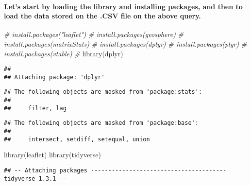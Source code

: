 \documentclass[
]{article}
\newenvironment{Shaded}{\begin{snugshade}}{\end{snugshade}}
\newcommand{\CommentTok}[1]{\textcolor[rgb]{0.56,0.35,0.01}{\textit{#1}}}
\newcommand{\FunctionTok}[1]{\textcolor[rgb]{0.00,0.00,0.00}{#1}}
\newcommand{\NormalTok}[1]{#1}
\begin{document}
\hypertarget{lets-start-by-loading-the-library-and-installing-packages-and-then-to-load-the-data-stored-on-the-.csv-file-on-the-above-query.}{%
\paragraph{Let's start by loading the library and installing packages,
and then to load the data stored on the .CSV file on the above
query.}\label{lets-start-by-loading-the-library-and-installing-packages-and-then-to-load-the-data-stored-on-the-.csv-file-on-the-above-query.}}

\begin{Shaded}
\begin{Highlighting}[]
\CommentTok{\# install.packages("leaflet")}
\CommentTok{\# install.packages(\textquotesingle{}geosphere\textquotesingle{})}
\CommentTok{\# install.packages(\textquotesingle{}matrixStats\textquotesingle{})}
\CommentTok{\# install.packages(\textquotesingle{}dplyr\textquotesingle{})}
\CommentTok{\# install.packages(\textquotesingle{}plyr\textquotesingle{})}
\CommentTok{\# install.packages(\textquotesingle{}vtable\textquotesingle{})}
\CommentTok{\# }
\FunctionTok{library}\NormalTok{(dplyr)}
\end{Highlighting}
\end{Shaded}

\begin{verbatim}
## 
## Attaching package: 'dplyr'
\end{verbatim}

\begin{verbatim}
## The following objects are masked from 'package:stats':
## 
##     filter, lag
\end{verbatim}

\begin{verbatim}
## The following objects are masked from 'package:base':
## 
##     intersect, setdiff, setequal, union
\end{verbatim}

\begin{Shaded}
\begin{Highlighting}[]
\FunctionTok{library}\NormalTok{(leaflet)}
\FunctionTok{library}\NormalTok{(tidyverse)}
\end{Highlighting}
\end{Shaded}

\begin{verbatim}
## -- Attaching packages --------------------------------------- tidyverse 1.3.1 --
\end{verbatim}
\end{document}
